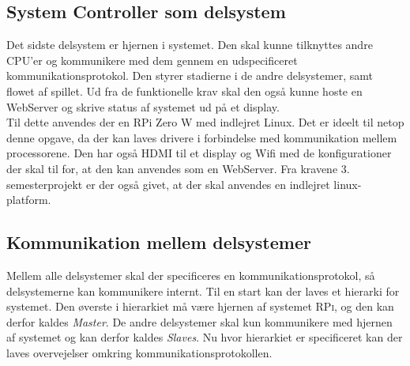 \documentclass[a4paper,12pt,fleqn,oneside]{article}
\begin{document}
\subsection{System Controller som delsystem}
Det sidste delsystem er hjernen i systemet. Den skal kunne tilknyttes andre CPU'er og kommunikere med dem gennem en udspecificeret kommunikationsprotokol. Den styrer stadierne i de andre delsystemer, samt flowet af spillet. Ud fra de funktionelle krav  skal den også kunne hoste en WebServer og skrive status af systemet ud på et display.\\
Til dette anvendes der en RPi Zero W med indlejret Linux\cite{rpi_webpage}. Det er ideelt til netop denne opgave, da der kan laves drivere i forbindelse med kommunikation mellem processorene. Den har også HDMI til et display og  Wifi med de konfigurationer der skal til for, at den kan anvendes som en WebServer. Fra kravene 3. semesterprojekt\cite{Universitet2018} er der også givet, at der skal anvendes en indlejret linux-platform. 

\subsection{Kommunikation mellem delsystemer}\label{sec:comm_analyse}
Mellem alle delsystemer skal der specificeres en kommunikationsprotokol, så delsystemerne kan kommunikere internt. Til en start kan der laves et hierarki for systemet. Den øverste i hierarkiet må være hjernen af systemet \textsc{RPi}, og den kan derfor kaldes \textit{Master}. De andre delsystemer skal kun kommunikere med hjernen af systemet og kan derfor kaldes \textit{Slaves}. Nu hvor hierarkiet er specificeret kan der laves overvejelser omkring kommunikationsprotokollen.
\end{document}
